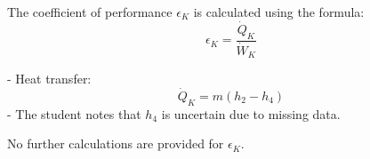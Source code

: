 The coefficient of performance \( \epsilon_K \) is calculated using the formula:  
\[
\epsilon_K = \frac{\dot{Q}_K}{\dot{W}_K}
\]  

- Heat transfer:  
  \[
  \dot{Q}_K = m \left( h_2 - h_4 \right)  
  \]  
- The student notes that \( h_4 \) is uncertain due to missing data.  

No further calculations are provided for \( \epsilon_K \).